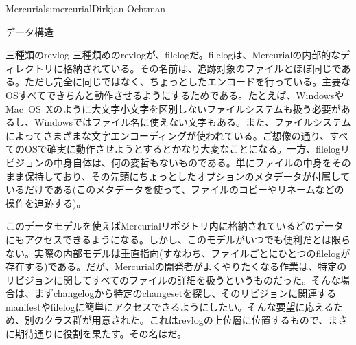 \begin{aosachapter}{Mercurial}{s:mercurial}{Dirkjan Ochtman}
\begin{aosasect1}{データ構造}
\begin{aosasect2}{三種類のrevlog}
三種類めのrevlogが、filelogだ。filelogは、Mercurialの内部的なディレクトリに格納されている。その名前は、追跡対象のファイルとほぼ同じである。ただし完全に同じではなく、ちょっとしたエンコードを行っている。主要なOSすべてできちんと動作させるようにするためである。たとえば、WindowsやMac~OS~Xのように大文字小文字を区別しないファイルシステムも扱う必要があるし、Windowsではファイル名に使えない文字もある。また、ファイルシステムによってさまざまな文字エンコーディングが使われている。ご想像の通り、すべてのOSで確実に動作させようとするとかなり大変なことになる。一方、filelogリビジョンの中身自体は、何の変哲もないものである。単にファイルの中身をそのまま保持しており、その先頭にちょっとしたオプションのメタデータが付属しているだけである(このメタデータを使って、ファイルのコピーやリネームなどの操作を追跡する)。

このデータモデルを使えばMercurialリポジトリ内に格納されているどのデータにもアクセスできるようになる。しかし、このモデルがいつでも便利だとは限らない。実際の内部モデルは垂直指向(すなわち、ファイルごとにひとつのfilelogが存在する)である。だが、Mercurialの開発者がよくやりたくなる作業は、特定のリビジョンに関してすべてのファイルの詳細を扱うというものだった。そんな場合は、まずchangelogから特定のchangesetを探し、そのリビジョンに関連するmanifestやfilelogに簡単にアクセスできるようにしたい。そんな要望に応えるため、別のクラス群が用意された。これはrevlogの上位層に位置するもので、まさに期待通りに役割を果たす。その名はだ。


\end{aosasect2}
\end{aosasect1}
\end{aosachapter}
